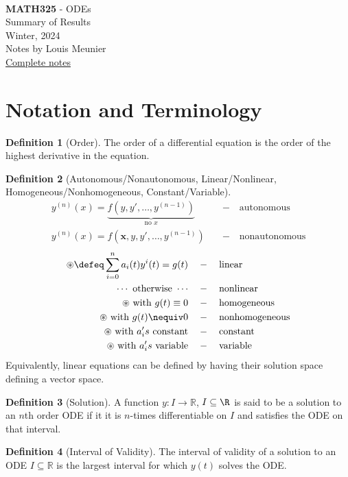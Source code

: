 \documentclass[12pt, oneside]{article}
\newcommand{\pageauthor}{Louis Meunier}
\newcommand{\pagetitle}{ODEs}
\newcommand{\pagesubtitle}{MATH325}
\newcommand{\pagedescription}{Summary of Results}
\newcommand{\pagesemester}{Winter, 2024 }
\newcommand{\thetitle}{
  \noindent
  \vspace*{5em}\\
  {\Large\textbf{\pagesubtitle} - \pagetitle}\\
  {\small{\pagedescription}}
  \vspace*{2em}\\
  {\small \pagesemester\\
  Notes by \pageauthor}\\
  {\small \href{https://notes.louismeunier.net/ODEs/odes.pdf}{Complete notes}}
}
\theoremstyle{definition}
\newtheorem{defn}{Definition}
\theoremstyle{plain}
\theoremstyle{remark}
\let\origsection=\section
\renewcommand\section[1]{\origsection{#1}\label{sec:\thesection}}
\begin{document}
\thetitle
\tableofcontents
{}

\section{Notation and Terminology}
\begin{defn}[Order]
  The order of a differential equation is the order of the highest derivative in the equation.
\end{defn}

\begin{defn}[Autonomous/Nonautonomous, Linear/Nonlinear, Homogeneous/Nonhomogeneous, Constant/Variable]
  \begin{align*}
    y^{(n)}(x) = \underbrace{f(y, y', \dots, y^{(n-1)})}_{\text{no } x} \quad &- \quad \text{autonomous}\\
    y^{(n)}(x) =f(\mathbf{x}, y, y', \dots, y^{(n-1)})\quad &-\quad \text{nonautonomous}
  \end{align*}
  \begin{align*}
    \circledast \defeq \sum_{i=0}^n a_i(t) y^{i}(t)=g(t)\quad &-\quad \text{linear}\\
    \cdots \text{ otherwise } \cdots \quad &-\quad \text{nonlinear}\\
    \circledast \text{ with } g(t) \equiv 0 \quad &-\quad \text{homogeneous}\\
    \circledast \text{ with } g(t) \nequiv 0 \quad &-\quad \text{nonhomogeneous}\\
    \circledast \text{ with } a_i's \text{ constant} \quad &-\quad \text{constant}\\
    \circledast \text{ with } a_i's \text{ variable} \quad &-\quad \text{variable}\\
  \end{align*}
  Equivalently, linear equations can be defined by having their solution space defining a vector space.
\end{defn}

\begin{defn}[Solution]
  A function $y : I \to \mathbb{R}$, $I \subseteq \R$ is said to be a solution to an $n$th order ODE if it it is $n$-times differentiable on $I$ and satisfies the ODE on that interval.
\end{defn}

\begin{defn}[Interval of Validity]
  The interval of validity of a solution to an ODE $I \subseteq \mathbb{R}$ is the largest interval for which $y(t)$ solves the ODE.
\end{defn}
\end{document}

